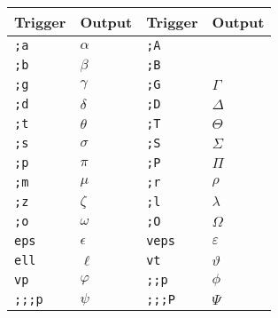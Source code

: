\documentclass{article}
\newcommand{\snippet}[1]{\textcolor{titlebg}{\texttt{#1}}}
\begin{document}
\begin{tcolorbox}[colback=orange!5!white,colframe=orange!75!black,title=Greek Letters]
\begin{tabularx}{\textwidth}{lXlX}
\textbf{Trigger} & \textbf{Output} & \textbf{Trigger} & \textbf{Output} \\
\hline
\snippet{;a} & \(\alpha\) & \snippet{;A} & \\
\snippet{;b} & \(\beta\) & \snippet{;B} & \\
\snippet{;g} & \(\gamma\) & \snippet{;G} & \(\Gamma\) \\
\snippet{;d} & \(\delta\) & \snippet{;D} & \(\Delta\) \\
\snippet{;t} & \(\theta\) & \snippet{;T} & \(\Theta\) \\
\snippet{;s} & \(\sigma\) & \snippet{;S} & \(\Sigma\) \\
\snippet{;p} & \(\pi\) & \snippet{;P} & \(\Pi\) \\
\snippet{;m} & \(\mu\) & \snippet{;r} & \(\rho\) \\
\snippet{;z} & \(\zeta\) & \snippet{;l} & \(\lambda\) \\
\snippet{;o} & \(\omega\) & \snippet{;O} & \(\Omega\) \\
\snippet{eps} & \(\epsilon\) & \snippet{veps} & \(\varepsilon\) \\
\snippet{ell} & \(\ell\) & \snippet{vt} & \(\vartheta\) \\
\snippet{vp} & \(\varphi\) & \snippet{;;p} & \(\phi\) \\
\snippet{;;;p} & \(\psi\) & \snippet{;;;P} & \(\Psi\) \\
\end{tabularx}
\end{tcolorbox}
\end{document}
